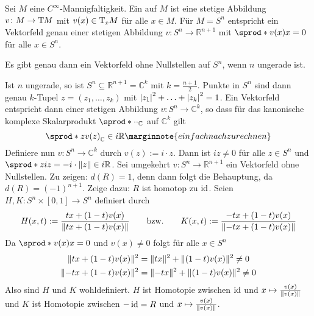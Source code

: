 \begin{erinnerungA}[{name=[Vektorfelder]}]
	Sei $M$ eine $C^\infty$-Mannigfaltigkeit. 
	Ein  auf $M$ ist eine stetige Abbildung $v \colon M \to \Tmap M$ mit $v(x) \in \Tmap_x M$ für alle $x \in M$.
	Für $M=S^n$ entspricht ein Vektorfeld genau einer stetigen Abbildung $v \colon S^n \to \mathbb{R}^{n+1}$ mit $\sprod*{v(x)}{x} =0$ für alle $x \in S^n$.
	\begin{figure}[th]
	\end{figure}
\end{erinnerungA}

\begin{satz}[{name=[{nicht verschwindende Vektorfelder auf $S^n$}]}]
	Es gibt genau dann ein Vektorfeld ohne Nullstellen auf $S^n$, wenn $n$ ungerade ist.
\end{satz}
\begin{beweis}
	Ist $n$ ungerade, so ist $S^{n} \subseteq \mathbb{R}^{n+1} = \mathbb{C}^{k}$ mit $k=\frac{n+1}{2}$. 
	Punkte in $S^n$ sind dann genau $k$-Tupel $z=(z_1, \ldots , z_k)$ mit $\abs*{z_1}^2 + \ldots + \abs*{z_k}^2 = 1$. 
	Ein Vektorfeld entspricht dann einer stetigen Abbildung $v \colon S^n \to \mathbb{C}^k$, so dass für das kanonische komplexe Skalarprodukt $\sprod*{\cdot }{\cdot}_\mathbb{C} $ auf $\mathbb{C}^k$ gilt
	\[
		\sprod*{z}{v(z)}_\mathbb{C} \in i \mathbb{R} \marginnote{einfach nachzurechnen}
	\]
	Definiere nun $v \colon S^n \to \mathbb{C}^k$ durch $v(z) := i \cdot z$. 
	Dann ist  $i z\neq 0$ für alle $z \in S^n$ und $\sprod*{z}{i z}= -i \cdot \norm{z} \in i \mathbb{R}$. 
	Sei umgekehrt $v \colon S^n \to \mathbb{R}^{n+1}$ ein Vektorfeld ohne Nullstellen. 
	Zu zeigen: $d(R)=1$, denn dann folgt die Behauptung, da $d(R)=(-1)^{n+1}$.
	Zeige dazu: $R$ ist homotop zu $\id$. 
	Seien $H, K \colon S^n \times [0,1] \to S^n$ definiert durch 
	\[
		H(x,t) := \frac{t x + (1-t)v(x)}{\norm{tx + (1-t)v(x)} } \qquad \text{bzw.}\qquad K(x,t) :=  \frac{-t x + (1-t)v(x)}{\norm{-tx + (1-t)v(x)}}
	\]
	Da $\sprod*{v(x)}{x}=0$  und $v(x)\not=0$ folgt für alle $x \in S^n$
	\begin{align*}
		\norm{t x + (1-t)v(x)}^2 &= \norm{tx}^2 + \norm{(1-t)v(x)}^2 \not=0   \\
		\norm{-t x + (1-t)v(x)}^2 &= \norm{-tx}^2 + \norm{(1-t)v(x)}^2 \not=0
	\end{align*}
	Also sind $H$ und $K$ wohldefiniert. 
	$H$ ist Homotopie zwischen $\id$ und $x \mapsto \frac{v(x)}{\norm{v(x)}}$ und $K$ ist Homotopie zwischen $-\id=R$ und $x \mapsto \frac{v(x)}{\norm{v(x)} } $.
\end{beweis}

